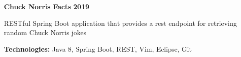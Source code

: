 %
    \headerrow
        {\textbf{\href{https://github.com/johatfie/chucknorrisfacts}{Chuck Norris Facts}}}
        {\textbf{2019}}
    \vspace{-1.2em}
    \begin{itemize*}
        \item RESTful Spring Boot application that provides a rest endpoint for retrieving random Chuck Norris jokes
    \end{itemize*}

    \vspace{-0.4em}
    \hspace{1.0em}
        {\textbf{Technologies:} Java 8, Spring Boot, REST, Vim, Eclipse, Git}


